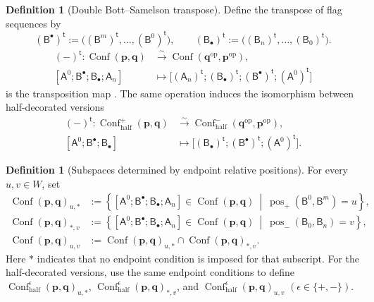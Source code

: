 \documentclass[10pt,a4paper]{article}
\theoremstyle{definition}
\newtheorem{definition}[theorem]{Definition}
\theoremstyle{remark}
\newcommand{\flagA}{\mathsf{A}}
\newcommand{\flagB}{\mathsf{B}}
\newcommand{\Conf}{\operatorname{Conf}}
\newcommand{\Confhalf}{\operatorname{Conf}_{\mathrm{half}}}
\newcommand{\pos}{\operatorname{pos}}
\begin{document}
\begin{definition}[Double Bott--Samelson transpose]
\label{def:double-bs-transposition}
Define the transpose of flag sequences by
\[
 (\flagB^\bullet)^{\mathsf t}
 :=\bigl((\flagB^m)^{\mathsf t},\ldots,(\flagB^0)^{\mathsf t}\bigr),
 \qquad
 (\flagB_\bullet)^{\mathsf t}
 :=\bigl((\flagB_n)^{\mathsf t},\ldots,(\flagB_0)^{\mathsf t}\bigr).
\]
\[
\begin{aligned}
 (-)^{\mathsf t}:
 \Conf(\mathbf p,\mathbf q)
 &\xrightarrow{\sim}
 \Conf(\mathbf q^{\mathrm{op}},\mathbf p^{\mathrm{op}}),
 \\
 [\flagA^0;\flagB^\bullet;\flagB_\bullet;\flagA_n]
 &\longmapsto
 \bigl[(\flagA_n)^{\mathsf t};
       (\flagB_\bullet)^{\mathsf t};
       (\flagB^\bullet)^{\mathsf t};
       (\flagA^0)^{\mathsf t}\bigr]
\end{aligned}
\]
is the transposition map \cite[Subsection~2.3]{ShenWeng2021}.  The same
operation induces the isomorphism between half-decorated versions
\begin{equation}
\begin{aligned}
 (-)^{\mathsf t}:
 \Confhalf^+(\mathbf p,\mathbf q)
 &\xrightarrow{\sim}
 \Confhalf^-(\mathbf q^{\mathrm{op}},
             \mathbf p^{\mathrm{op}}),\\
 [\flagA^0;\flagB^\bullet;\flagB_\bullet]
 &\longmapsto
 \bigl[(\flagB_\bullet)^{\mathsf t};
       (\flagB^\bullet)^{\mathsf t};
       (\flagA^0)^{\mathsf t}\bigr].
\end{aligned}
 \label{eq:half-conf-transposition}
\end{equation}
\end{definition}

\begin{definition}[Subspaces determined by endpoint relative positions]
\label{def:endpoint-strata}
For every \(u,v\in W\), set
\[
 \begin{aligned}
 \Conf(\mathbf p,\mathbf q)_{u,*}
 &:=%
 \left\{[\flagA^0;\flagB^\bullet;\flagB_\bullet;\flagA_n]
 \in\Conf(\mathbf p,\mathbf q)\ \middle|\
 \pos_+(\flagB^0,\flagB^m)=u\right\},\\
 \Conf(\mathbf p,\mathbf q)_{*,v}
 &:=%
 \left\{[\flagA^0;\flagB^\bullet;\flagB_\bullet;\flagA_n]
 \in\Conf(\mathbf p,\mathbf q)\ \middle|\
 \pos_-(\flagB_0,\flagB_n)=v\right\},\\
 \Conf(\mathbf p,\mathbf q)_{u,v}
 &:=%
 \Conf(\mathbf p,\mathbf q)_{u,*}
 \cap
 \Conf(\mathbf p,\mathbf q)_{*,v}.
\end{aligned}
\]
Here \(*\) indicates that no endpoint condition is imposed for that subscript.
For the half-decorated versions, use the same endpoint conditions to define
\(\Confhalf^\epsilon(\mathbf p,\mathbf q)_{u,*}\),
\(\Confhalf^\epsilon(\mathbf p,\mathbf q)_{*,v}\), and
\(\Confhalf^\epsilon(\mathbf p,\mathbf q)_{u,v}\)
\((\epsilon\in\{+,-\})\).
\end{definition}
\end{document}
